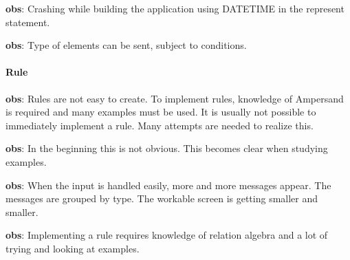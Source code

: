 \begin{obs}\label{obs:rq1-65:10-11}
    \textbf{obs}: Crashing while building the application using DATETIME in the represent statement.
\end{obs}

\begin{obs}\label{obs:rq2-8:7-10}
    \textbf{obs}: Type of elements can be sent, subject to conditions.
\end{obs}

\paragraph{Rule}
\begin{obs}\label{obs:rq1-4}
    \textbf{obs}: Rules are not easy to create.
    To implement rules, knowledge of Ampersand is required and many examples must be used.
    It is usually not possible to immediately implement a rule.
    Many attempts are needed to realize this.
\end{obs}

\begin{obs}\label{obs:rq1-55:2-11}
    \textbf{obs}: In the beginning this is not obvious.
    This becomes clear when studying examples.
\end{obs}

\begin{obs}\label{obs:rq1-59:9-11}
    \textbf{obs}: When the input is handled easily, more and more messages appear.
    The messages are grouped by type.
    The workable screen is getting smaller and smaller.    
\end{obs}

\begin{obs}\label{obs:rq1-17}
    \textbf{obs}: Implementing a rule requires knowledge of relation algebra and a lot of trying and looking at examples.
\end{obs}

